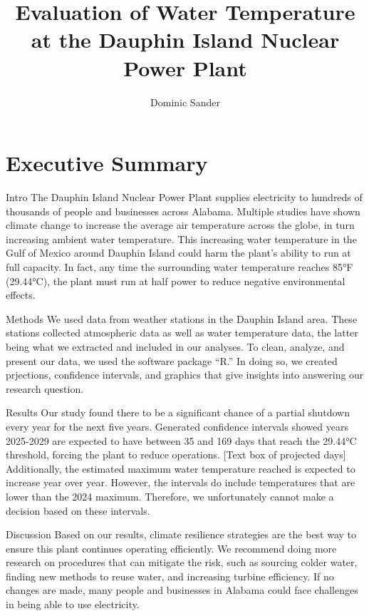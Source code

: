 \documentclass[
  letterpaper,
  DIV=11,
  numbers=noendperiod]{scrreprt}
\title{Evaluation of Water Temperature at the Dauphin Island Nuclear
Power Plant}
\author{Dominic Sander}
\date{}
\renewcommand*\contentsname{Table of contents}
\newcommand\contentsname{Table of contents}
\begin{document}
\maketitle

\renewcommand*\contentsname{Table of contents}
{
\hypersetup{linkcolor=}
\setcounter{tocdepth}{2}
\tableofcontents
}


\chapter*{Executive Summary}\label{executive-summary}


Intro The Dauphin Island Nuclear Power Plant supplies electricity to
hundreds of thousands of people and businesses across Alabama. Multiple
studies have shown climate change to increase the average air
temperature across the globe, in turn increasing ambient water
temperature. This increasing water temperature in the Gulf of Mexico
around Dauphin Island could harm the plant's ability to run at full
capacity. In fact, any time the surrounding water temperature reaches
85°F (29.44°C), the plant must run at half power to reduce negative
environmental effects.

Methods We used data from weather stations in the Dauphin Island area.
These stations collected atmospheric data as well as water temperature
data, the latter being what we extracted and included in our analyses.
To clean, analyze, and present our data, we used the software package
``R.'' In doing so, we created prjections, confidence intervals, and
graphics that give insights into answering our research question.

Results Our study found there to be a significant chance of a partial
shutdown every year for the next five years. Generated confidence
intervals showed years 2025-2029 are expected to have between 35 and 169
days that reach the 29.44°C threshold, forcing the plant to reduce
operations. {[}Text box of projected days{]} Additionally, the estimated
maximum water temperature reached is expected to increase year over
year. However, the intervals do include temperatures that are lower than
the 2024 maximum. Therefore, we unfortunately cannot make a decision
based on these intervals.

Discussion Based on our results, climate resilience strategies are the
best way to ensure this plant continues operating efficiently. We
recommend doing more research on procedures that can mitigate the risk,
such as sourcing colder water, finding new methods to reuse water, and
increasing turbine efficiency. If no changes are made, many people and
businesses in Alabama could face challenges in being able to use
electricity.
\end{document}
